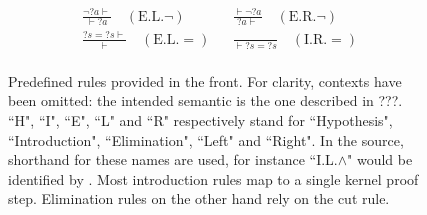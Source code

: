 \begin{figure}[hbt!]
\begin{align*}
  \frac{\neg {?a} \vdash}{\vdash {?a}} \quad (\text{E.L.} \neg) && \frac{\vdash \neg {?a}}{{?a} \vdash} \quad (\text{E.R.} \neg) \\[1em]
  \frac{{?s} = {?s} \vdash}{\vdash} \quad (\text{E.L.} =) && \frac{}{\vdash {?s} = {?s}} \quad (\text{I.R.} =) \\[1em]
  \end{align*}
  \endgroup
  \caption[Rules]{Predefined rules provided in the front. For clarity, contexts have been omitted: the intended semantic is the one described in ???. ``H", ``I", ``E", ``L" and ``R" respectively stand for ``Hypothesis", ``Introduction", ``Elimination", ``Left" and ``Right". In the source, shorthand for these names are used, for instance ``I.L.$\land$" would be identified by . Most introduction rules map to a single kernel proof step. Elimination rules on the other hand rely on the cut rule.}
  \label{fig:rules-list-1}
\end{figure}

